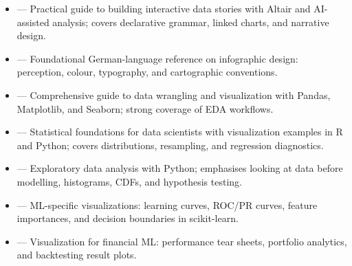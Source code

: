 \begin{tcbitemize}[ skin=sectionraster ]
    \tcbitem[title={Recommended Sources for Visualization}, raster multicolumn=6]
    \begin{itemize}
        \item {} --- Practical guide to building
              interactive data stories with Altair and AI-assisted analysis; covers
              declarative grammar, linked charts, and narrative design.
        \item {} --- Foundational German-language
              reference on infographic design: perception, colour, typography, and
              cartographic conventions.
        \item {} --- Comprehensive guide to data
              wrangling and visualization with Pandas, Matplotlib, and Seaborn;
              strong coverage of EDA workflows.
        \item {} --- Statistical foundations
              for data scientists with visualization examples in R and Python; covers
              distributions, resampling, and regression diagnostics.
        \item {} --- Exploratory data analysis
              with Python; emphasises looking at data before modelling, histograms,
              CDFs, and hypothesis testing.
        \item {} --- ML-specific visualizations:
              learning curves, ROC/PR curves, feature importances, and decision
              boundaries in scikit-learn.
        \item {} --- Visualization for
              financial ML: performance tear sheets, portfolio analytics, and
              backtesting result plots.
    \end{itemize}
\end{tcbitemize}
